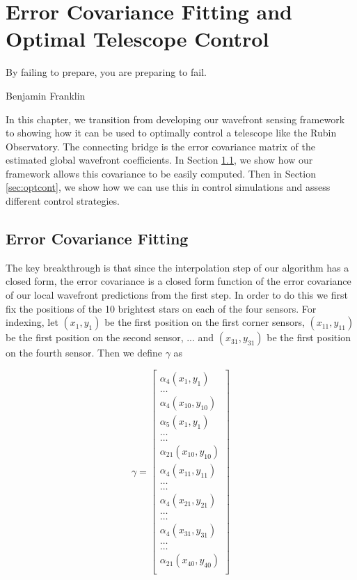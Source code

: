 \chapter{Error Covariance Fitting and Optimal Telescope Control}
\label{chap:err}

\epigraph{By failing to prepare, you are preparing to fail.}{Benjamin Franklin}

In this chapter, we transition from developing our wavefront sensing framework to showing how it can be used to optimally control a telescope like the Rubin Observatory. The connecting bridge is the error covariance matrix of the estimated global wavefront coefficients. In Section \ref{sec:error}, we show how our framework allows this covariance to be easily computed. Then in Section \ref{sec:optcont}, we show how we can use this in control simulations and assess different control strategies.

\section{Error Covariance Fitting}
\label{sec:error}

The key breakthrough is that since the interpolation step of our algorithm has a closed form, the error covariance is a closed form function of the error covariance of our local wavefront predictions from the first step. In order to do this we first fix the positions of the 10 brightest stars on each of the four sensors. For indexing, let $(x_1,y_1)$ be the first position on the first corner sensors, $(x_{11},y_{11})$ be the first position on the second sensor, ... and $(x_{31},y_{31})$ be the first position on the fourth sensor. Then we define $\gamma$ as

\begin{equation*}
\gamma = \begin{bmatrix}
\alpha_4(x_1,y_1)\\
\dots\\
\alpha_4(x_{10}, y_{10})\\
\alpha_5(x_1,y_1)\\
\dots\\
\dots \\
\alpha_{21}(x_{10},y_{10})\\
\alpha_4(x_{11}, y_{11})\\
\dots \\
\dots \\
\alpha_4(x_{21}, y_{21})\\
\dots \\
\dots \\
\alpha_4(x_{31}, y_{31})\\
\dots \\
\dots \\
\alpha_{21}(x_{40},y_{40})\\
\end{bmatrix}
\end{equation*}

